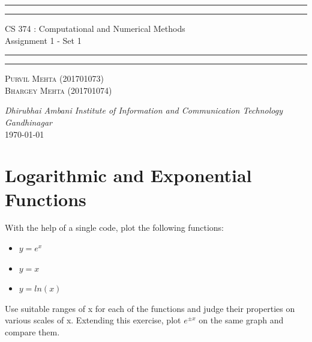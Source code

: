 \documentclass{article}
\begin{document}
\begin{titlepage}
	\centering 
	\scshape
	\vspace*{\baselineskip}
	\rule{\textwidth}{1.6pt}\vspace*{-\baselineskip}\vspace*{2pt}
	\rule{\textwidth}{0.4pt} 
	\vspace{0.75\baselineskip}
	
	{\Large CS 374 : Computational and Numerical Methods \\\vspace{0.75\baselineskip} Assignment 1 - Set 1}
	\vspace{0.75\baselineskip}
	
	\rule{\textwidth}{0.4pt}\vspace*{-\baselineskip}\vspace{3.2pt} 
	\rule{\textwidth}{1.6pt}
	
	\vspace{2\baselineskip}  
	
	\vspace*{3\baselineskip}
	
	\vspace{0.5\baselineskip} %
	
	{\scshape\large Purvil Mehta (201701073) \\ Bhargey Mehta (201701074) \\} 
	
	\vspace{1\baselineskip} 
	
	\textit{Dhirubhai Ambani Institute of Information and Communication Technology \\ Gandhinagar\\} 
	\vspace*{2\baselineskip}
	\today


\end{titlepage}

\newpage
\tableofcontents
\newpage
	
\section{Logarithmic and Exponential Functions}
With the help of a single code, plot the following functions:
\begin{itemize}
    \item $y = e^x$
    \item $y = x$
    \item $y = ln(x)$
\end{itemize}
Use suitable ranges of x for each of the functions and judge their properties on various scales of x. Extending this exercise, plot $e^{\pm x}$ on the same graph and compare them.
\end{document}
